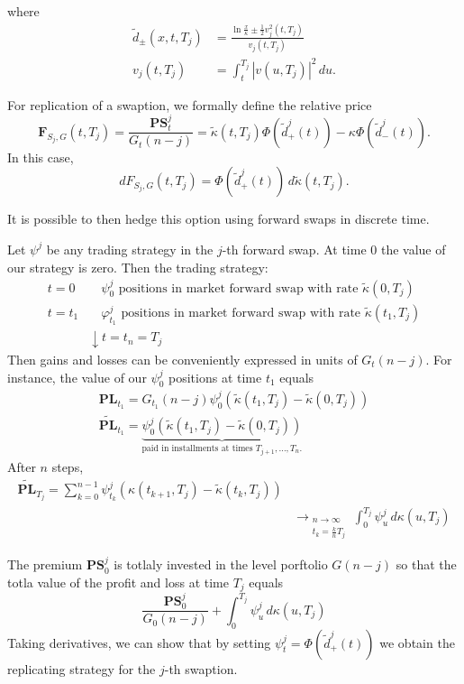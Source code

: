 \documentclass[10pt, oneside, reqno]{amsbook}
\theoremstyle{plain}%
\theoremstyle{definition}
\theoremstyle{remark}
\renewcommand{\phi}{\varphi}
\numberwithin{equation}{chapter}
\begin{document}
 where \begin{align*}
    \tilde d_{\pm}(x, t, T_j) &= \frac{\ln \frac{x}{\kappa} \pm \frac{1}{2} v^2_j(t, T_j)}{v_j(t, T_j)} \\
    v_j(t, T_j) &= \int_t^{T_j} \left| v(u, T_j) \right|^2 \, du.
\end{align*}


For replication of a swaption, we formally define the relative price \[
    \mathbf{F}_{S_j, G}(t, T_j) = \frac{\mathbf{PS}_t^j}{G_t(n-j)} = \tilde \kappa(t, T_j) \Phi \left( \tilde d_+^j(t) \right) - \kappa \Phi(\tilde d^j_-(t)).
\]  In this case, \[
    dF_{S_j, G}(t, T_j) = \Phi(\tilde d_+^j(t)) \, d \tilde \kappa(t, T_j).
\]

It is possible to then hedge this option using forward swaps in discrete time.  

Let $\psi^j$ be any trading strategy in the $j$-th forward swap.  At time $0$ the value of our strategy is zero.  Then the trading strategy: \begin{align*}
    t = 0 & \quad \text{$\psi^j_0$ positions in market forward swap with rate $\tilde \kappa(0, T_j)$} \\
    t = t_1  & \quad \text{$\phi^j_{t_1}$ positions in market forward swap with rate $\tilde \kappa(t_1, T_j)$} \\
        &\downarrow
    t = t_n = T_j
\end{align*}  Then gains and losses can be conveniently expressed in units of $G_t(n-j)$.  For instance, the value of our $\psi^j_0$ positions at time $t_1$ equals \begin{align*}
    \mathbf{PL}_{t_1} = G_{t_1}(n-j) \psi^j_0 \left( \tilde \kappa(t_1, T_j) - \tilde \kappa(0, T_j) \right) \\
    \tilde{\mathbf{PL}}_{t_1} = \underbrace{\psi^j_0 \left( \tilde \kappa(t_1, T_j) - \tilde \kappa(0, T_j) \right)}_{\text{paid in installments at times $T_{j+1}, \dots, T_n$.}}
\end{align*}  After $n$ steps, \begin{align*}
    \tilde{\mathbf{PL}}_{T_j} = \sum_{k=0}^{n-1} \psi_{t_k}^j \left( \kappa(t_{k+1}, T_j) - \tilde \kappa(t_k, T_j) \right) \\
    &\rightarrow_{\substack{n \rightarrow \infty \\ t_k = \frac{k}{n} T_j}} \int_0^{T_j} \psi^j_u \, d\kappa(u, T_j) 
\end{align*}

The premium $\mathbf{PS}_0^j$ is totlaly invested in the level porftolio $G(n-j)$ so that the totla value of the profit and loss at time $T_j$ equals \[
    \frac{\mathbf{PS}^j_0}{G_0(n-j)} + \int_0^{T_j} \psi^j_u \, d \kappa(u, T_j)
\]  Taking derivatives, we can show that by setting $\psi^j_t = \Phi \left( \tilde d_+^j(t) \right)$ we obtain the replicating strategy for the $j$-th swaption.
\end{document}
